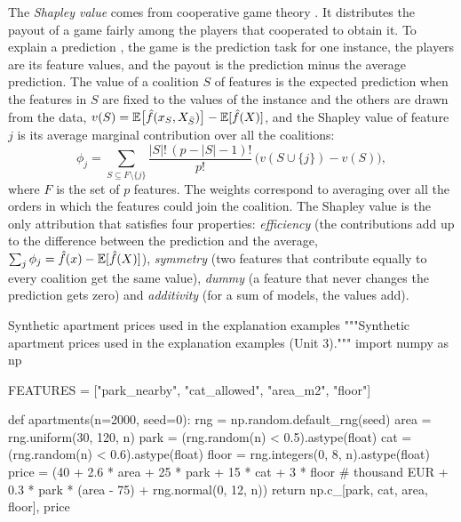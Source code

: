 The \emph{Shapley value} comes from cooperative game theory \citep{shapley1953value}. It distributes the
payout of a game fairly among the players that cooperated to obtain it. To explain a prediction
\citep{strumbelj2014explaining}, the game is the prediction task for one instance, the players are its
feature values, and the payout is the prediction minus the average prediction. The value of a
coalition $S$ of features is the expected prediction when the features in $S$ are fixed to the values
of the instance and the others are drawn from the data,
$v(S)=\mathbb{E}\bigl[\hat f(x_S,X_{\bar S})\bigr]-\mathbb{E}[\hat f(X)]$, and the Shapley value of feature $j$ is its
average marginal contribution over all the coalitions:
\begin{equation}\label{eq:shapley}
  \phi_j=\sum_{S\subseteq F\setminus\{j\}}\frac{|S|!\,(p-|S|-1)!}{p!}\,\bigl(v(S\cup\{j\})-v(S)\bigr),
\end{equation}
where $F$ is the set of $p$ features. The weights correspond to averaging over all the orders in which
the features could join the coalition. The Shapley value is the only attribution that satisfies four
properties: \emph{efficiency} (the contributions add up to the difference between the prediction and
the average, $\sum_j\phi_j=\hat f(x)-\mathbb{E}[\hat f(X)]$), \emph{symmetry} (two features that contribute
equally to every coalition get the same value), \emph{dummy} (a feature that never changes the
prediction gets zero) and \emph{additivity} (for a sum of models, the values add).

\begin{pylisting}[label={lst:apartments}]{Synthetic apartment prices used in the explanation examples}
"""Synthetic apartment prices used in the explanation examples (Unit 3)."""
import numpy as np

FEATURES = ["park_nearby", "cat_allowed", "area_m2", "floor"]

def apartments(n=2000, seed=0):
    rng = np.random.default_rng(seed)
    area = rng.uniform(30, 120, n)
    park = (rng.random(n) < 0.5).astype(float)
    cat = (rng.random(n) < 0.6).astype(float)
    floor = rng.integers(0, 8, n).astype(float)
    price = (40 + 2.6 * area + 25 * park + 15 * cat + 3 * floor     # thousand EUR
             + 0.3 * park * (area - 75) + rng.normal(0, 12, n))
    return np.c_[park, cat, area, floor], price
\end{pylisting}

